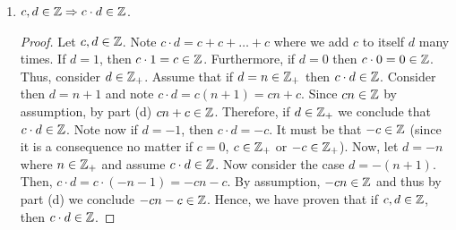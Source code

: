 \documentclass[12pt]{article}
\begin{document}
\begin{enumerate}[label=(\alph*)]
\begin{proof}
			Therefore, we have proved that for $c, d \in \ZZ$, then $c + d, c - d \in \ZZ$.  
		\end{proof}
		\item $c, d \in \mathbb{Z} \Rightarrow c \cdot d \in \mathbb{Z}$. 
		\begin{proof}
			Let $c, d \in \ZZ$. Note $c \cdot d = c + c + \ldots + c$ where we add $c$ to itself $d$ many
			times. If $d = 1$, then $c \cdot 1 = c \in \mathbb{Z}$. Furthermore, if $d = 0$ then $c \cdot 0 = 0 \in \mathbb{Z}$.
			Thus, consider $d \in \mathbb{Z}_{+}$. Assume that if $d = n \in \mathbb{Z}_{+}$ then $c \cdot d \in \mathbb{Z}$.
			Consider then $d = n +  1$ and note $c \cdot d = c(n + 1) = cn + c$. Since $cn \in \mathbb{Z}$ by 
			assumption, by part (d) $cn + c \in \mathbb{Z}$. Therefore, if $d \in \mathbb{Z}_{+}$ we conclude that 
			$c \cdot d \in \mathbb{Z}$. Note now if $d = -1$, then $c \cdot d = -c$. It must be that $-c \in \mathbb{Z}$
			(since it is a consequence no matter if $c = 0$, $c \in \mathbb{Z}_{+}$ or $-c \in \mathbb{Z}_{+}$).
			Now, let $d = -n$ where $n \in \mathbb{Z}_{+}$ and assume $c \cdot d \in \mathbb{Z}$. Now consider the 
			case $d = -(n + 1)$. Then, $c \cdot d = c \cdot (-n - 1) = -cn - c$. By assumption, 
			$-cn \in \mathbb{Z}$ and thus by part (d) we conclude $-cn - c \in \mathbb{Z}$.
			Hence, we have proven that if $c, d \in \ZZ$, then $c \cdot d \in \mathbb{Z}$.
		\end{proof}
	\end{enumerate}
	
\end{document}
